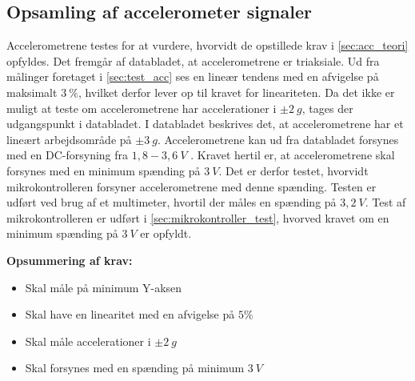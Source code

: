 \subsection{Opsamling af accelerometer signaler}

Accelerometrene testes for at vurdere, hvorvidt de opstillede krav i \autoref{sec:acc_teori} opfyldes. 
Det fremgår af databladet, at accelerometrene er triaksiale.  
Ud fra målinger foretaget i \autoref{sec:test_acc} ses en lineær tendens med en afvigelse på maksimalt $3~\%$, hvilket derfor lever op til kravet for lineariteten. Da det ikke er muligt at teste om accelerometrene har accelerationer i $\pm2~g$, tages der udgangspunkt i databladet. I databladet beskrives det, at accelerometrene har et lineært arbejdsområde på $\pm 3~g$.
Accelerometrene kan ud fra databladet forsynes med en DC-forsyning fra $1,8-3,6~V$ \citep{analogdevices2009}. Kravet hertil er, at accelerometrene skal forsynes med en minimum spænding på $3~V$. Det er derfor testet, hvorvidt mikrokontrolleren forsyner accelerometrene med denne spænding. Testen er udført ved brug af et multimeter, hvortil der måles en spænding på $3,2~V$. Test af mikrokontrolleren er udført i \autoref{sec:mikrokontroller_test}, hvorved kravet om en minimum spænding på $3~V$ er opfyldt.

\vspace{3mm}
\textbf{Opsummering af krav:}
\begin{itemize}
\item[\text{\sffamily \checkmark}] Skal måle på minimum Y-aksen
\item[\text{\sffamily \checkmark}] Skal have en linearitet med en afvigelse på $5\%$
\item[\text{\sffamily \checkmark}] Skal måle accelerationer i $\pm2~g$
\item[\text{\sffamily \checkmark}] Skal forsynes med en spænding på minimum $3~V$
\end{itemize}

